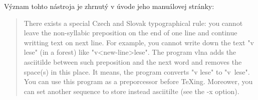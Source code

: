 Význam tohto nástroja je zhrnutý v úvode jeho manuálovej stránky:

\begin{quote}
There exists a special Czech and Slovak typographical rule: you cannot leave the non-syllabic preposition on the end of one line and continue writting text on next line. For  example, you  cannot  write  down  the text "v lese" (in a forest) like "v<new-line>lese". The program vlna adds the asciitilde between  such  preposition  and  the next  word and removes the space(s) in this place.  It means, the program converts "v lese" to "v~lese". You  can  use  this  program  as  a  preporcessor  before  TeXing. Moreower,  you  can  set  another  sequence  to  store instead asciitilte (see the -x option).
\end{quote}
